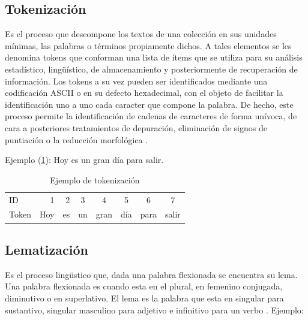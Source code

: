 
\subsection{Tokenización}
Es el proceso que descompone los textos de una colección en sus unidades mínimas, las palabras
o términos propiamente dichos. A tales elementos se les denomina tokens que conforman una lista de
ítems que se utiliza para su análisis estadístico, ling{\"u}ístico, de almacenamiento y posteriormente de
recuperación de información. Los tokens a su vez pueden ser identificados mediante una codificación
ASCII o en su defecto hexadecimal, con el objeto de facilitar la identificación uno a uno cada caracter
que compone la palabra. De hecho, este proceso permite la identificación de cadenas de caracteres de
forma unívoca, de cara a posteriores tratamientos de depuración, eliminación de signos de puntiación
o la reducción morfológica \citep{CT12}.

Ejemplo  (\ref{tabla:sencilla}): Hoy es un gran día para salir.

\begin{table}[htbp]
	\begin{center}
	\begin{tabular}{|lrrccccc|}
		\hline
		ID & 1 & 2 & 3 & 4 & 5 & 6 & 7 \\ 
		Token & Hoy & es & un & gran & día & para & salir \\ \hline
		\hline
	\end{tabular}
	\caption{Ejemplo de tokenización}
	\label{tabla:sencilla}
	\end{center}
	
\end{table}


\subsection{Lematización}
Es el proceso lingüstico que, dada una palabra flexionada se encuentra su
lema. Una palabra flexionada es cuando esta en el plural, en femenino conjugada,
diminutivo o en superlativo. El lema es la palabra que esta en singular para
sustantivo, singular masculino para adjetivo e infinitivo para un verbo \citep{CT13}. Ejemplo:

